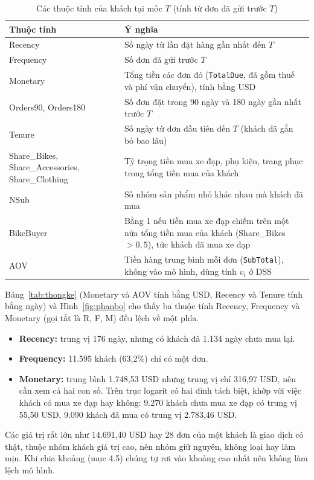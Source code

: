 \begin{table}[H]
\centering
\caption{Các thuộc tính của khách tại mốc $T$ (tính từ đơn đã gửi trước $T$)}
\label{tab:thuoctinh}
\footnotesize
\begin{tabular}{p{4.4cm}p{10cm}}
\toprule
Thuộc tính & Ý nghĩa \\
\midrule
Recency & Số ngày từ lần đặt hàng gần nhất đến $T$ \\
Frequency & Số đơn đã gửi trước $T$ \\
Monetary & Tổng tiền các đơn đó (\texttt{TotalDue}, đã gồm thuế và phí vận chuyển), tính bằng USD \\
Orders90, Orders180 & Số đơn đặt trong 90 ngày và 180 ngày gần nhất trước $T$ \\
Tenure & Số ngày từ đơn đầu tiên đến $T$ (khách đã gắn bó bao lâu) \\
Share\_Bikes, Share\_Accessories, Share\_Clothing & Tỷ trọng tiền mua xe đạp, phụ kiện, trang phục trong tổng tiền mua của khách \\
NSub & Số nhóm sản phẩm nhỏ khác nhau mà khách đã mua \\
BikeBuyer & Bằng 1 nếu tiền mua xe đạp chiếm trên một nửa tổng tiền mua của khách (Share\_Bikes $> 0{,}5$), tức khách đã mua xe đạp \\
AOV & Tiền hàng trung bình mỗi đơn (\texttt{SubTotal}), không vào mô hình, dùng tính $v_i$ ở DSS \\
\bottomrule
\end{tabular}
\end{table}

Bảng~\ref{tab:thongke} (Monetary và AOV tính bằng USD, Recency và Tenure tính bằng ngày) và Hình~\ref{fig:phanbo} cho thấy ba thuộc tính Recency, Frequency và Monetary (gọi tắt là R, F, M) đều lệch về một phía.
\begin{itemize}
    \item \textbf{Recency:} trung vị 176 ngày, nhưng có khách đã 1.134 ngày chưa mua lại.
    \item \textbf{Frequency:} 11.595 khách (63,2\%) chỉ có một đơn.
    \item \textbf{Monetary:} trung bình 1.748,53 USD nhưng trung vị chỉ 316,97 USD, nên cần xem cả hai con số. Trên trục logarit có hai đỉnh tách biệt, khớp với việc khách có mua xe đạp hay không: 9.270 khách chưa mua xe đạp có trung vị 55,50 USD, 9.090 khách đã mua có trung vị 2.783,46 USD.
\end{itemize}
Các giá trị rất lớn như 14.691,40 USD hay 28 đơn của một khách là giao dịch có thật, thuộc nhóm khách giá trị cao, nên nhóm giữ nguyên, không loại hay làm mịn. Khi chia khoảng (mục 4.5) chúng tự rơi vào khoảng cao nhất nên không làm lệch mô hình.

